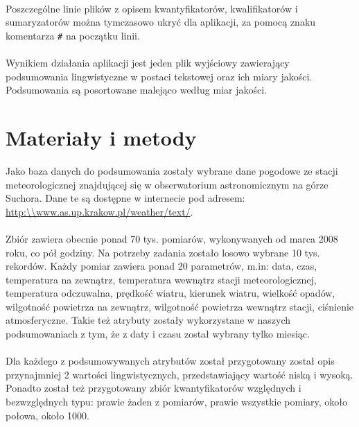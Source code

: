 \documentclass{classrep}
\begin{document}
\paragraph{}
Poszczególne linie plików z opisem kwantyfikatorów, kwalifikatorów i sumaryzatorów można tymczasowo ukryć dla aplikacji, za pomocą znaku komentarza \verb|#| na początku linii.

\paragraph{}
Wynikiem działania aplikacji jest jeden plik wyjściowy zawierający podsumowania lingwistyczne w postaci tekstowej oraz ich miary jakości. Podsumowania są posortowane malejąco według miar jakości.

\section{Materiały i metody}
Jako baza danych do podsumowania zostały wybrane dane pogodowe ze stacji meteorologicznej znajdującej się w obserwatorium astronomicznym na górze Suchora. Dane te są dostępne w internecie pod adresem:
\url{http:\\www.as.up.krakow.pl/weather/text/}.

\paragraph{}
Zbiór zawiera obecnie ponad 70 tys. pomiarów, wykonywanych od marca 2008 roku, co pół godziny. Na potrzeby zadania zostało losowo wybrane 10 tys. rekordów.
Każdy pomiar zawiera ponad 20 parametrów, m.in: data, czas, temperatura na zewnątrz, temperatura wewnątrz stacji meteorologicznej, temperatura odczuwalna, prędkość wiatru, kierunek wiatru, wielkość opadów, wilgotność powietrza na zewnątrz, wilgotność powietrza wewnątrz stacji, ciśnienie atmosferyczne. Takie też atrybuty zostały wykorzystane w naszych podsumowaniach z tym, że z daty i czasu został wybrany tylko miesiąc.

\paragraph{}
Dla każdego z podsumowywanych atrybutów został przygotowany został opis przynajmniej 2 wartości lingwistycznych, przedstawiający wartość niską i wysoką. Ponadto został też przygotowany zbiór kwantyfikatorów względnych i bezwzględnych typu: prawie żaden z pomiarów, prawie wszystkie pomiary, około połowa, około 1000.
\end{document}
